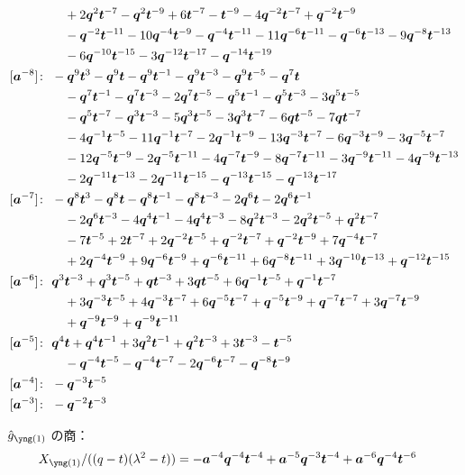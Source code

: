 \begin{align*}
& \quad +2 \bq^{2} \bt^{-7} -\bq^{2} \bt^{-9} +6 \bt^{-7} -\bt^{-9} -4 \bq^{-2} \bt^{-7} +\bq^{-2} \bt^{-9} \\
& \quad -\bq^{-2} \bt^{-11} -10 \bq^{-4} \bt^{-9} -\bq^{-4} \bt^{-11} -11 \bq^{-6} \bt^{-11} -\bq^{-6} \bt^{-13} -9 \bq^{-8} \bt^{-13} \\
& \quad -6 \bq^{-10} \bt^{-15} -3 \bq^{-12} \bt^{-17} -\bq^{-14} \bt^{-19} \\
[\ba^{-8}]\colon\ & -\bq^{9} \bt^{3} -\bq^{9} \bt -\bq^{9} \bt^{-1} -\bq^{9} \bt^{-3} -\bq^{9} \bt^{-5} -\bq^{7} \bt \\
& \quad -\bq^{7} \bt^{-1} -\bq^{7} \bt^{-3} -2 \bq^{7} \bt^{-5} -\bq^{5} \bt^{-1} -\bq^{5} \bt^{-3} -3 \bq^{5} \bt^{-5} \\
& \quad -\bq^{5} \bt^{-7} -\bq^{3} \bt^{-3} -5 \bq^{3} \bt^{-5} -3 \bq^{3} \bt^{-7} -6 \bq \bt^{-5} -7 \bq \bt^{-7} \\
& \quad -4 \bq^{-1} \bt^{-5} -11 \bq^{-1} \bt^{-7} -2 \bq^{-1} \bt^{-9} -13 \bq^{-3} \bt^{-7} -6 \bq^{-3} \bt^{-9} -3 \bq^{-5} \bt^{-7} \\
& \quad -12 \bq^{-5} \bt^{-9} -2 \bq^{-5} \bt^{-11} -4 \bq^{-7} \bt^{-9} -8 \bq^{-7} \bt^{-11} -3 \bq^{-9} \bt^{-11} -4 \bq^{-9} \bt^{-13} \\
& \quad -2 \bq^{-11} \bt^{-13} -2 \bq^{-11} \bt^{-15} -\bq^{-13} \bt^{-15} -\bq^{-13} \bt^{-17} \\
[\ba^{-7}]\colon\ & -\bq^{8} \bt^{3} -\bq^{8} \bt -\bq^{8} \bt^{-1} -\bq^{8} \bt^{-3} -2 \bq^{6} \bt -2 \bq^{6} \bt^{-1} \\
& \quad -2 \bq^{6} \bt^{-3} -4 \bq^{4} \bt^{-1} -4 \bq^{4} \bt^{-3} -8 \bq^{2} \bt^{-3} -2 \bq^{2} \bt^{-5} +\bq^{2} \bt^{-7} \\
& \quad -7 \bt^{-5} +2 \bt^{-7} +2 \bq^{-2} \bt^{-5} +\bq^{-2} \bt^{-7} +\bq^{-2} \bt^{-9} +7 \bq^{-4} \bt^{-7} \\
& \quad +2 \bq^{-4} \bt^{-9} +9 \bq^{-6} \bt^{-9} +\bq^{-6} \bt^{-11} +6 \bq^{-8} \bt^{-11} +3 \bq^{-10} \bt^{-13} +\bq^{-12} \bt^{-15} \\
[\ba^{-6}]\colon\ & \bq^{3} \bt^{-3} +\bq^{3} \bt^{-5} +\bq \bt^{-3} +3 \bq \bt^{-5} +6 \bq^{-1} \bt^{-5} +\bq^{-1} \bt^{-7} \\
& \quad +3 \bq^{-3} \bt^{-5} +4 \bq^{-3} \bt^{-7} +6 \bq^{-5} \bt^{-7} +\bq^{-5} \bt^{-9} +\bq^{-7} \bt^{-7} +3 \bq^{-7} \bt^{-9} \\
& \quad +\bq^{-9} \bt^{-9} +\bq^{-9} \bt^{-11} \\
[\ba^{-5}]\colon\ & \bq^{4} \bt +\bq^{4} \bt^{-1} +3 \bq^{2} \bt^{-1} +\bq^{2} \bt^{-3} +3 \bt^{-3} -\bt^{-5} \\
& \quad -\bq^{-4} \bt^{-5} -\bq^{-4} \bt^{-7} -2 \bq^{-6} \bt^{-7} -\bq^{-8} \bt^{-9} \\
[\ba^{-4}]\colon\ & -\bq^{-3} \bt^{-5} \\
[\ba^{-3}]\colon\ & -\bq^{-2} \bt^{-3}
\end{align*}

$\hat g_{\yone}$ の商：
\begin{align*}
X_{\yone}/((q - t)(\lambda^2 - t)) &= -\ba^{-4} \bq^{-4} \bt^{-4} +\ba^{-5} \bq^{-3} \bt^{-4} +\ba^{-6} \bq^{-4} \bt^{-6}
\end{align*}
